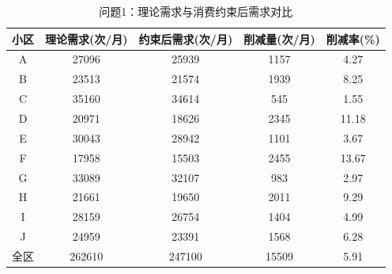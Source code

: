 \begin{table}[h]
\centering
\caption{问题1：理论需求与消费约束后需求对比}
\begin{tabular}{|c|c|c|c|c|}
\hline
小区 & 理论需求(次/月) & 约束后需求(次/月) & 削减量(次/月) & 削减率(\%) \\
\hline
A & 27096 & 25939 & 1157 & 4.27 \\
B & 23513 & 21574 & 1939 & 8.25 \\
C & 35160 & 34614 & 545 & 1.55 \\
D & 20971 & 18626 & 2345 & 11.18 \\
E & 30043 & 28942 & 1101 & 3.67 \\
F & 17958 & 15503 & 2455 & 13.67 \\
G & 33089 & 32107 & 983 & 2.97 \\
H & 21661 & 19650 & 2011 & 9.29 \\
I & 28159 & 26754 & 1404 & 4.99 \\
J & 24959 & 23391 & 1568 & 6.28 \\
全区 & 262610 & 247100 & 15509 & 5.91 \\
\hline
\end{tabular}
\end{table}
